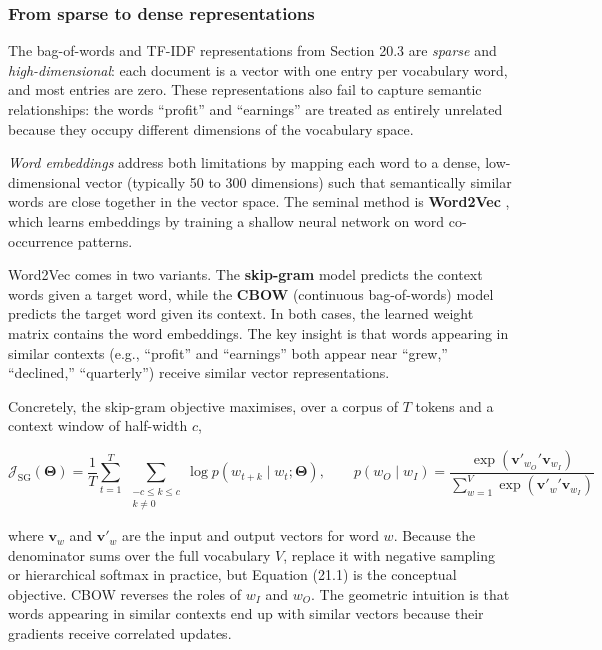 \subsubsection{From sparse to dense representations}

The bag-of-words and TF-IDF representations from Section 20.3 are \textit{sparse} and \textit{high-dimensional}: each document is a vector with one entry per vocabulary word, and most entries are zero. These representations also fail to capture semantic relationships: the words ``profit'' and ``earnings'' are treated as entirely unrelated because they occupy different dimensions of the vocabulary space.

\textit{Word embeddings} address both limitations by mapping each word to a dense, low-dimensional vector (typically 50 to 300 dimensions) such that semantically similar words are close together in the vector space. The seminal method is \textbf{Word2Vec} \citep{mikolov2013efficient}, which learns embeddings by training a shallow neural network on word co-occurrence patterns.

Word2Vec comes in two variants. The \textbf{skip-gram} model predicts the context words given a target word, while the \textbf{CBOW} (continuous bag-of-words) model predicts the target word given its context. In both cases, the learned weight matrix contains the word embeddings. The key insight is that words appearing in similar contexts (e.g., ``profit'' and ``earnings'' both appear near ``grew,'' ``declined,'' ``quarterly'') receive similar vector representations.

Concretely, the skip-gram objective maximises, over a corpus of $T$ tokens and a context window of half-width $c$,

\begin{equation}
\mathcal{J}_{\text{SG}}(\boldsymbol{\Theta}) = \frac{1}{T}\sum_{t=1}^{T}\,\sum_{\substack{-c \le k \le c \\ k \ne 0}} \log p(w_{t+k} \mid w_t; \boldsymbol{\Theta}), \qquad p(w_O \mid w_I) = \frac{\exp({\mathbf{v}'_{w_O}}' \mathbf{v}_{w_I})}{\sum_{w=1}^{V} \exp({\mathbf{v}'_{w}}' \mathbf{v}_{w_I})}
\tag{21.1}
\end{equation}

where $\mathbf{v}_{w}$ and $\mathbf{v}'_{w}$ are the input and output vectors for word $w$. Because the denominator sums over the full vocabulary $V$, \cite{mikolov2013efficient} replace it with negative sampling or hierarchical softmax in practice, but Equation (21.1) is the conceptual objective. CBOW reverses the roles of $w_I$ and $w_O$. The geometric intuition is that words appearing in similar contexts end up with similar vectors because their gradients receive correlated updates.

